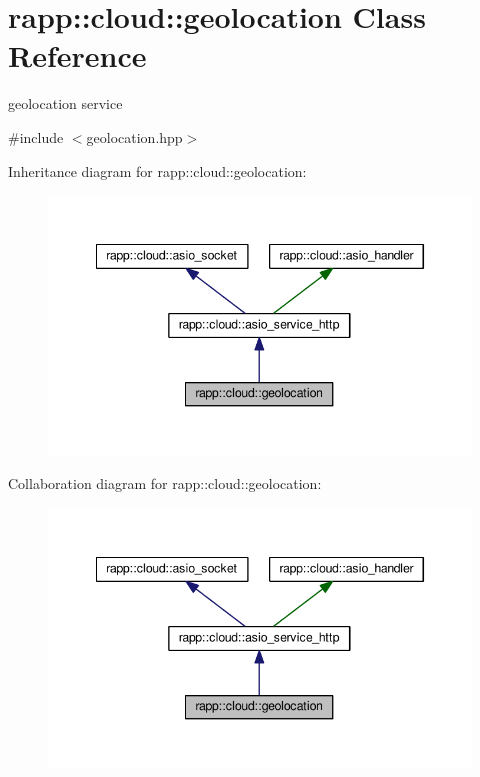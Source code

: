 \hypertarget{classrapp_1_1cloud_1_1geolocation}{\section{rapp\-:\-:cloud\-:\-:geolocation Class Reference}
\label{classrapp_1_1cloud_1_1geolocation}
}


geolocation service  




{\ttfamily \#include $<$geolocation.\-hpp$>$}



Inheritance diagram for rapp\-:\-:cloud\-:\-:geolocation\-:
\nopagebreak
\begin{figure}[H]
\begin{center}
\leavevmode
\includegraphics[width=345pt]{classrapp_1_1cloud_1_1geolocation__inherit__graph}
\end{center}
\end{figure}


Collaboration diagram for rapp\-:\-:cloud\-:\-:geolocation\-:
\nopagebreak
\begin{figure}[H]
\begin{center}
\leavevmode
\includegraphics[width=345pt]{classrapp_1_1cloud_1_1geolocation__coll__graph}
\end{center}
\end{figure}
